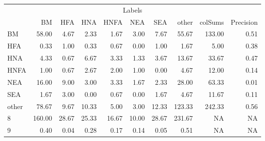 \begin{table}
\centering\begingroup\fontsize{11}{13}\selectfont

\begin{tabular}{lrrrrrr>{}r|rr}
\toprule
\multicolumn{10}{c}{Labels} \\
\cmidrule(l{3pt}r{3pt}){1-10}
  & BM & HFA & HNA & HNFA & NEA & SEA & other & colSums & Precision\\
\midrule
BM & 58.00 & 4.67 & 2.33 & 1.67 & 3.00 & 7.67 & 55.67 & 133.00 & 0.51\\
HFA & 0.33 & 1.00 & 0.33 & 0.67 & 0.00 & 1.00 & 1.67 & 5.00 & 0.38\\
HNA & 4.33 & 0.67 & 6.67 & 3.33 & 1.33 & 3.67 & 13.67 & 33.67 & 0.47\\
HNFA & 1.00 & 0.67 & 2.67 & 2.00 & 1.00 & 0.00 & 4.67 & 12.00 & 0.14\\
NEA & 16.00 & 9.00 & 3.00 & 3.33 & 1.67 & 2.33 & 28.00 & 63.33 & 0.01\\
\addlinespace
SEA & 1.67 & 3.00 & 0.00 & 0.67 & 0.00 & 1.67 & 4.67 & 11.67 & 0.11\\
other & 78.67 & 9.67 & 10.33 & 5.00 & 3.00 & 12.33 & 123.33 & 242.33 & 0.56\\
8 & 160.00 & 28.67 & 25.33 & 16.67 & 10.00 & 28.67 & 231.67 & NA & NA\\
9 & 0.40 & 0.04 & 0.28 & 0.17 & 0.14 & 0.05 & 0.51 & NA & NA\\
\bottomrule
\end{tabular}
\endgroup{}
\end{table}
